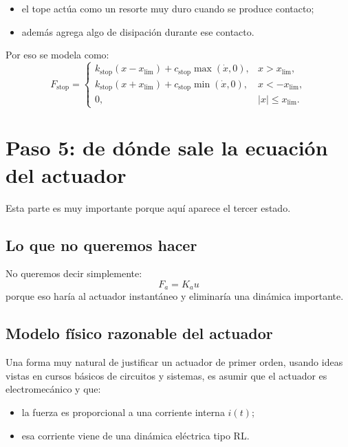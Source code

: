 \documentclass[11pt]{article}
\begin{document}
\begin{itemize}[leftmargin=1.2cm]
\item el tope act\'ua como un resorte muy duro cuando se produce contacto;
\item adem\'as agrega algo de disipaci\'on durante ese contacto.
\end{itemize}

Por eso se modela como:
\begin{equation}
F_{\text{stop}}=
\begin{cases}
k_{\text{stop}}(x-x_{\text{lim}})+c_{\text{stop}}\max(\dot{x},0), & x>x_{\text{lim}},\\[4pt]
k_{\text{stop}}(x+x_{\text{lim}})+c_{\text{stop}}\min(\dot{x},0), & x<-x_{\text{lim}},\\[4pt]
0, & |x|\le x_{\text{lim}}.
\end{cases}
\label{eq:stops}
\end{equation}

\section{Paso 5: de d\'onde sale la ecuaci\'on del actuador}

Esta parte es muy importante porque aqu\'i aparece el tercer estado.

\subsection{Lo que no queremos hacer}

No queremos decir simplemente:
\[
F_a = K_a u
\]
porque eso har\'ia al actuador instant\'aneo y eliminar\'ia una din\'amica importante.

\subsection{Modelo f\'isico razonable del actuador}

Una forma muy natural de justificar un actuador de primer orden, usando ideas vistas en cursos b\'asicos de circuitos y sistemas, es asumir que el actuador es electromec\'anico y que:

\begin{itemize}[leftmargin=1.2cm]
\item la fuerza es proporcional a una corriente interna $i(t)$;
\item esa corriente viene de una din\'amica el\'ectrica tipo RL.
\end{itemize}
\end{document}
